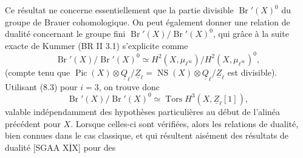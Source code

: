  Ce résultat ne concerne essentiellement que la partie divisible $\operatorname{Br}'(X)^0$ du groupe de Brauer cohomologique. On peut également donner une relation de dualité concernant le  groupe fini $\operatorname{Br}'(X)/\operatorname{Br}'(X)^0$, qui grâce à la suite exacte de Kummer (BR II 3.1) s'explicite comme
\[
\tag{8.8}\operatorname{Br}'(X)/\operatorname{Br}'(X)^0\simeq H^2(X,\mu_{\ell^\infty})/H^2(X,\mu_{\ell^\infty})^0,
\]
(compte tenu que $\operatorname{Pic}(X)\otimes\underline Q_{\ell}/\underline Z_{\ell}=\operatorname{NS}(X)\otimes\underline Q_{\ell}/\underline Z_{\ell}$ est divisible). Utilisant (8.3) pour $i=3$, on trouve donc
\[
\tag{8.9}\operatorname{Br}'(X)/\operatorname{Br}'(X)^0\simeq\operatorname{Tors}H^3(X,\underline Z_{\ell}[1]),
\]
\inserted{(}valable indépendamment des hypothèses particulières   au début de l'alinéa précédent pour $X$. Lorsque celles-ci sont vérifiées, alors les relations de dualité, bien connues dans le cas classique, et qui résultent aisément  des résultats de dualité [SGAA $\overline{\underline{\mathrm{XIX}}}$\quad] pour des
\margin{$\times$}
